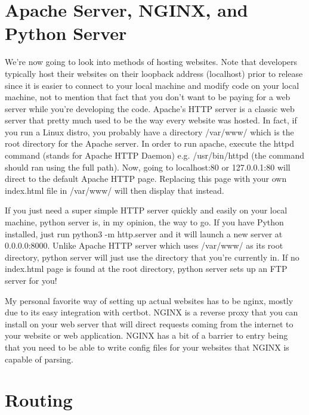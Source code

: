 \documentclass{article}
\begin{document}
\section{Apache Server, NGINX, and Python Server}

We're now going to look into methods of hosting websites. Note that developers typically host their websites on 
their loopback address (localhost) prior to release since it is easier to connect to your local machine and 
modify code on your local machine, not to mention that fact that you don't want to be paying for a web server 
while you're developing the code. Apache's HTTP server is a classic web server that pretty much used to be the 
way every website was hosted. In fact, if you run a Linux distro, you probably have a directory /var/www/ which 
is the root directory for the Apache server. In order to run apache, execute the httpd command (stands for 
Apache HTTP Daemon) e.g. /usr/bin/httpd (the command should ran using the full path). Now, going to 
localhost:80 or 127.0.0.1:80 will direct to the default Apache HTTP page. Replacing this page with your own 
index.html file in /var/www/ will then display that instead. 

If you just need a super simple HTTP server quickly and easily on your local machine, python server is, in my 
opinion, the way to go. If you have Python installed, just run python3 -m http.server and it will launch a new 
server at 0.0.0.0:8000. Unlike Apache HTTP server which uses /var/www/ as its root directory, python server will 
just use the directory that you're currently in. If no index.html page is found at the root directory, python 
server sets up an FTP server for you! 

My personal favorite way of setting up actual websites has to be nginx, mostly due to its easy integration with 
certbot. NGINX is a reverse proxy that you can install on your web server that will direct requests coming 
from the internet to your website or web application. NGINX has a bit of a barrier to entry being that you need 
to be able to write config files for your websites that NGINX is capable of parsing. 

\section{Routing}
\end{document}
